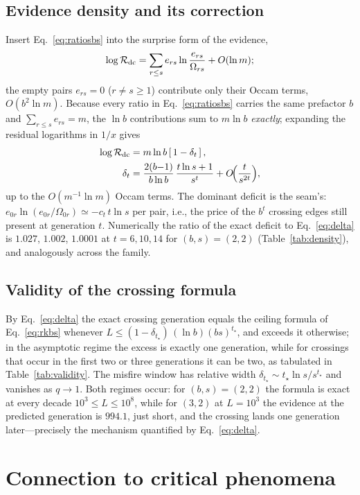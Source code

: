 \documentclass[preprint,12pt]{elsarticle}
\newcommand{\Rev}{\mathcal{R}}
\newcommand{\logR}{\log \Rev}
\newcommand{\Om}{\Omega}
\begin{document}
\subsection{Evidence density and its correction}
Insert Eq.~\eqref{eq:ratiosbs} into the surprise form of the evidence,
\begin{equation}
  \logR_{\rm dc}=\sum_{r\le s}e_{rs}\ln\frac{e_{rs}}{\Om_{rs}}+O(\ln m);
  \label{eq:surprise}
\end{equation}
the empty
pairs $e_{rs}=0$ ($r\neq s\ge1$) contribute only their Occam terms,
$O(b^2\ln m)$. Because every ratio in Eq.~\eqref{eq:ratiosbs} carries the same
prefactor $b$ and $\sum_{r\le s}e_{rs}=m$, the $\ln b$ contributions sum to
$m\ln b$ \emph{exactly}; expanding the residual logarithms in $1/x$ gives
\begin{align}
  \logR_{\rm dc} &= m\ln b\left[\,1-\delta_t\,\right],
  \label{eq:delta}\\
  \delta_t &= \frac{2(b{-}1)}{b\ln b}\,\frac{t\ln s+1}{s^{t}}
  +O\!\Big(\frac{t}{s^{2t}}\Big),\notag
\end{align}
up to the $O(m^{-1}\ln m)$ Occam terms. The dominant deficit is the seam's:
$e_{0r}\ln(e_{0r}/\Om_{0r})\simeq -c_t\,t\ln s$ per pair, i.e., the price of
the $b^t$ crossing edges still present at generation $t$. Numerically the
ratio of the exact deficit to Eq.~\eqref{eq:delta} is $1.027$, $1.002$,
$1.0001$ at $t=6,10,14$ for $(b,s)=(2,2)$ (Table~\ref{tab:density}), and
analogously across the family.

\subsection{Validity of the crossing formula}
By Eq.~\eqref{eq:delta} the exact crossing generation equals the ceiling formula
of Eq.~\eqref{eq:rkbs} whenever $L\le(1-\delta_{t_\star})\,(\ln b)(bs)^{t_\star}$,
and exceeds it otherwise; in the asymptotic regime the excess is exactly one
generation, while for crossings that occur in the first two or three
generations it can be two, as tabulated in Table~\ref{tab:validity}. The
misfire window has relative width $\delta_{t_\star}\sim t_\star\ln
s/s^{t_\star}$ and vanishes as $q\to1$. Both regimes occur: for
$(b,s)=(2,2)$ the formula is exact at every decade $10^3\le L\le10^8$, while
for $(3,2)$ at $L=10^3$ the evidence at the predicted generation is $994.1$,
just short, and the crossing lands one generation later---precisely the
mechanism quantified by Eq.~\eqref{eq:delta}.

\section{Connection to critical phenomena}
\label{sec:critical}
\end{document}
